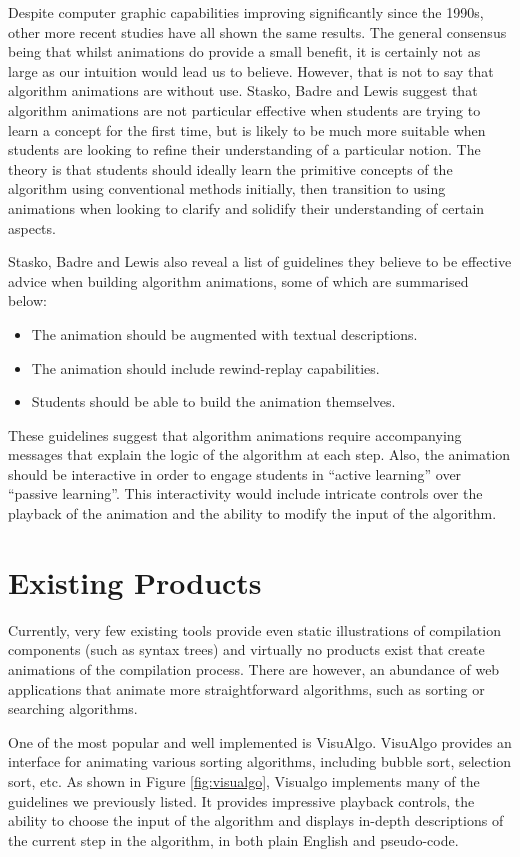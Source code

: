 \documentclass{l4proj}
\begin{document}
Despite computer graphic capabilities improving significantly since the 1990s, other more recent studies have all shown the same results. The general consensus being that whilst animations do provide a small benefit, it is certainly not as large as our intuition would lead us to believe. However, that is not to say that algorithm animations are without use. Stasko, Badre and Lewis suggest that algorithm animations are not particular effective when students are trying to learn a concept for the first time, but is likely to be much more suitable when students are looking to refine their understanding of a particular notion. The theory is that students should ideally learn the primitive concepts of the algorithm using conventional methods initially, then transition to using animations when looking to clarify and solidify their understanding of certain aspects.

Stasko, Badre and Lewis also reveal a list of guidelines they believe to be effective advice when building algorithm animations, some of which are summarised below:
\begin{itemize}
\item The animation should be augmented with textual descriptions.
\item The animation should include rewind-replay capabilities.
\item Students should be able to build the animation themselves.
\end{itemize}
These guidelines suggest that algorithm animations require accompanying messages that explain the logic of the algorithm at each step. Also, the animation should be interactive in order to engage students in ``active learning'' over ``passive learning''. This interactivity would include intricate controls over the playback of the animation and the ability to modify the input of the algorithm.

\section{Existing Products}
Currently, very few existing tools provide even static illustrations of compilation components (such as syntax trees) and virtually no products exist that create animations of the compilation process. There are however, an abundance of web applications that animate more straightforward algorithms, such as sorting or searching algorithms. 

One of the most popular and well implemented is VisuAlgo\cite{visualgo}. VisuAlgo provides an interface for animating various sorting algorithms, including bubble sort, selection sort, etc. As shown in Figure \ref{fig:visualgo}, Visualgo implements many of the guidelines we previously listed. It provides impressive playback controls, the ability to choose the input of the algorithm and displays in-depth descriptions of the current step in the algorithm, in both plain English and pseudo-code. 
\end{document}
